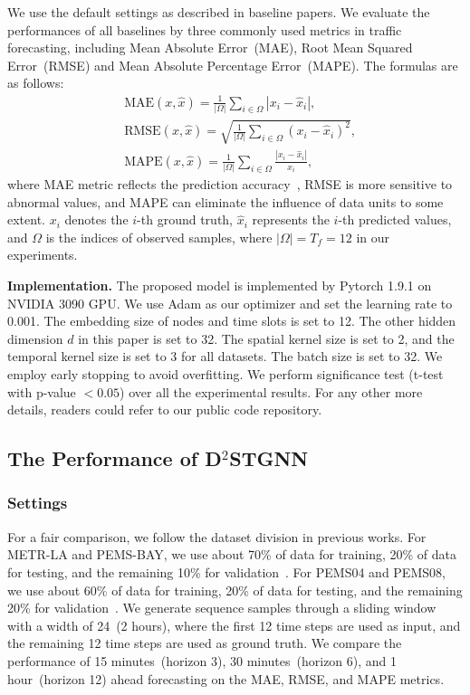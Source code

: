 \documentclass[sigconf, nonacm]{acmart}
\begin{document}
We use the default settings as described in baseline papers. 
We evaluate the performances of all baselines by three commonly used metrics in traffic forecasting, including Mean Absolute Error~(MAE), Root Mean Squared Error~(RMSE) and Mean Absolute Percentage Error~(MAPE).
The formulas are as follows:
\begin{equation}
\begin{aligned}
    & \text{MAE}(x, \hat{x})=\frac{1}{|\Omega|} \sum_{i\in\Omega}|x_i - \hat{x}_i|, \\
    & \text{RMSE}(x, \hat{x})=\sqrt{\frac{1}{|\Omega|} \sum_{i\in\Omega}(x_i - \hat{x}_i)^2}, \\
    & \text{MAPE}(x, \hat{x})=\frac{1}{|\Omega|} \sum_{i\in\Omega}\frac{|x_i - \hat{x}_i|}{x_i},
\end{aligned}
\end{equation}
where MAE metric reflects the prediction accuracy~\cite{2021DGCRN}, RMSE is more sensitive to abnormal values, and MAPE can eliminate the influence of data units to some extent. $x_i$ denotes the $i$-th ground truth, $\hat{x}_i$ represents the $i$-th predicted values, and $\Omega$ is the indices of observed samples, where $|\Omega|=T_f=12$ in our experiments.

\noindent\textbf{Implementation.}
The proposed model is implemented by Pytorch 1.9.1 on NVIDIA 3090 GPU.
We use Adam as our optimizer and set the learning rate to 0.001.
The embedding size of nodes and time slots is set to 12.
The other hidden dimension $d$ in this paper is set to 32.
The spatial kernel size is set to 2, {\color{black} and the temporal kernel size is set to 3 for all datasets}.
The batch size is set to 32.
We employ early stopping to avoid overfitting.
We perform significance test (t-test with p-value $< 0.05$) over all the experimental results.
For any other more details, readers could refer to our public code repository.

\subsection{The Performance of D$^2$STGNN}
\subsubsection{Settings}
For a fair comparison, we follow the dataset division in previous works.
For METR-LA and PEMS-BAY, we use about 70\% of data for training, 20\% of data for testing, and the remaining 10\% for validation~\cite{2017DCRNN, GWNet, 2020MTGNN, 2021DGCRN}.
For PEMS04 and PEMS08, we use about 60\% of data for training, 20\% of data for testing, and the remaining 20\% for validation~\cite{2021ASTGNN, 2019ASTGCN, 2020STSGCN}.
We generate sequence samples through a sliding window with a width of 24~(2 hours), where the first 12 time steps are used as input, and the remaining 12 time {\color{black}steps} are used as ground truth.
We compare the performance of 15 minutes~(horizon 3), 30 minutes~(horizon 6), and 1 hour~(horizon 12) ahead forecasting {\color{black} on the MAE, RMSE, and MAPE metrics}.
\end{document}
